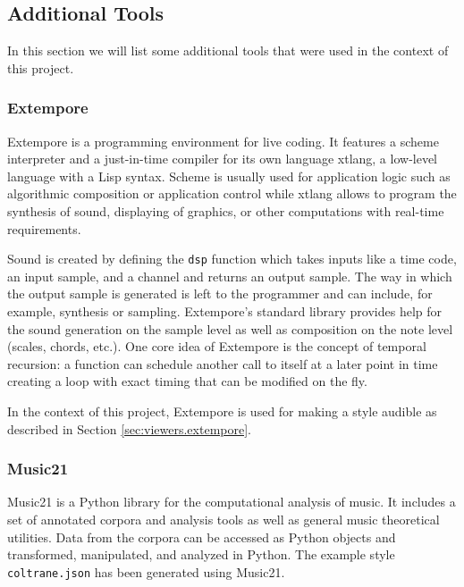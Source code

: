 \subsection{Additional Tools}
\label{sec:tools}

In this section we will list some additional tools that were used in the context of this project.

\subsubsection{Extempore}
\label{sec:tools.extempore}

Extempore \cite{extempore} is a programming environment for live coding.
It features a scheme interpreter and a just-in-time compiler for its own language xtlang, a low-level language with a Lisp syntax.
Scheme is usually used for application logic such as algorithmic composition or application control while xtlang allows to program the synthesis of sound, displaying of graphics, or other computations with real-time requirements.

Sound is created by defining the \texttt{dsp} function which takes inputs like a time code, an input sample, and a channel and returns an output sample.
The way in which the output sample is generated is left to the programmer and can include, for example, synthesis or sampling.
Extempore's standard library provides help for the sound generation on the sample level as well as composition on the note level (scales, chords, etc.).
One core idea of Extempore is the concept of temporal recursion: a function can schedule another call to itself at a later point in time creating a loop with exact timing that can be modified on the fly.

In the context of this project, Extempore is used for making a style audible as described in Section \ref{sec:viewers.extempore}.

\subsubsection{Music21}
\label{sec:tools.music21}

Music21 \cite{music21} is a Python library for the computational analysis of music.
It includes a set of annotated corpora and analysis tools as well as general music theoretical utilities.
Data from the corpora can be accessed as Python objects and transformed, manipulated, and analyzed in Python.
The example style \texttt{coltrane.json} has been generated using Music21.

